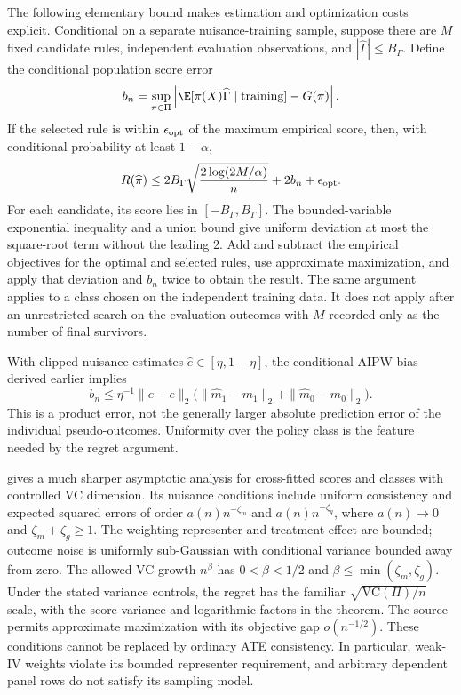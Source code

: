 The following elementary bound makes estimation and optimization costs
explicit. Conditional on a separate nuisance-training sample, suppose
there are $M$ fixed candidate rules, independent evaluation observations,
and $|\widehat\Gamma|\le B_\Gamma$. Define the conditional population
score error
\[
 b_n=\sup_{\pi\in\Pi}
 \left|\E[\pi(X)\widehat\Gamma\mid\text{training}]-G(\pi)\right|.
\]
If the selected rule is within $\epsilon_{\rm opt}$ of the maximum
empirical score, then, with conditional probability at least $1-\alpha$,
\begin{equation}
 R(\widehat\pi)\le
 2B_\Gamma\sqrt{\frac{2\log(2M/\alpha)}{n}}
       +2b_n+\epsilon_{\rm opt}.
 \label{r3:finite-regret}
\end{equation}
For each candidate, its score lies in $[-B_\Gamma,B_\Gamma]$.
The bounded-variable exponential inequality and a union bound give
uniform deviation at most the square-root term without the leading
2. Add and subtract the empirical objectives for the optimal and
selected rules, use approximate maximization, and apply that deviation
and $b_n$ twice to obtain the result. The same argument applies to a
class chosen on the independent training data. It does not apply after
an unrestricted search on the evaluation outcomes with $M$ recorded
only as the number of final survivors.

With clipped nuisance estimates $\widehat e\in[\eta,1-\eta]$,
the conditional AIPW bias derived earlier implies
\[
 b_n\le\eta^{-1}\|\widehat e-e\|_2
       \bigl(\|\widehat m_1-m_1\|_2+\|\widehat m_0-m_0\|_2\bigr).
\]
This is a product error, not the generally larger absolute prediction
error of the individual pseudo-outcomes. Uniformity over the policy
class is the feature needed by the regret argument.

\citet[Assumptions 1--4 and Theorem 1]{policy2021} gives a much
sharper asymptotic analysis for cross-fitted scores and classes with
controlled VC dimension. Its nuisance conditions include uniform
consistency and expected squared errors of order $a(n)n^{-\zeta_m}$
and $a(n)n^{-\zeta_g}$, where $a(n)\to0$ and
$\zeta_m+\zeta_g\ge1$. The weighting representer and treatment
effect are bounded; outcome noise is uniformly sub-Gaussian with
conditional variance bounded away from zero. The allowed VC growth
$n^\beta$ has $0<\beta<1/2$ and
$\beta\le\min(\zeta_m,\zeta_g)$. Under the stated variance controls,
the regret has the familiar $\sqrt{\mathrm{VC}(\Pi)/n}$ scale,
with the score-variance and logarithmic factors in the theorem.
The source permits approximate maximization with its objective gap
$o(n^{-1/2})$. These conditions cannot be replaced by ordinary
ATE consistency. In particular, weak-IV weights violate its bounded
representer requirement, and arbitrary dependent panel rows do not
satisfy its sampling model.

